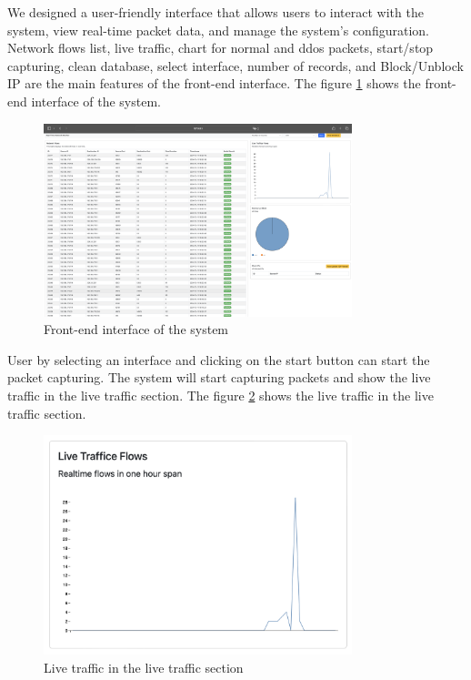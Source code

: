 We designed a user-friendly interface that allows users to interact with the system, view real-time packet data, and manage the system's configuration.
Network flows list, live traffic, chart for normal and ddos packets, start/stop capturing, clean database, select interface, number of records, and Block/Unblock IP are the main features of the front-end interface.
The figure \ref{fig:front-end} shows the front-end interface of the system.
\begin{figure}[H]
    \centering
    \includegraphics[width=0.8\textwidth]{../images/front-end.png}
    \caption{Front-end interface of the system}
    \label{fig:front-end}
\end{figure}
User by selecting an interface and clicking on the start button can start the packet capturing. 
The system will start capturing packets and show the live traffic in the live traffic section. 
The figure \ref{fig:live-traffic} shows the live traffic in the live traffic section.
\begin{figure}[H]
    \centering
    \includegraphics[width=0.8\textwidth]{../images/live-traffic.png}
    \caption{Live traffic in the live traffic section}
    \label{fig:live-traffic}
\end{figure}
